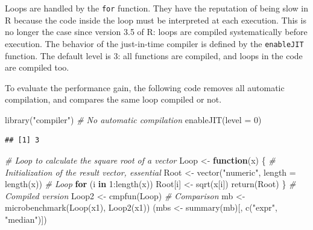 \documentclass[
  12pt,
  american,
  a4paper,
  extrafontsizes,onecolumn,openright
  ]{memoir}
\newenvironment{Shaded}{\begin{snugshade}}{\end{snugshade}}
\newcommand{\AttributeTok}[1]{\textcolor[rgb]{0.77,0.63,0.00}{#1}}
\newcommand{\CommentTok}[1]{\textcolor[rgb]{0.56,0.35,0.01}{\textit{#1}}}
\newcommand{\ControlFlowTok}[1]{\textcolor[rgb]{0.13,0.29,0.53}{\textbf{#1}}}
\newcommand{\DecValTok}[1]{\textcolor[rgb]{0.00,0.00,0.81}{#1}}
\newcommand{\FunctionTok}[1]{\textcolor[rgb]{0.00,0.00,0.00}{#1}}
\newcommand{\NormalTok}[1]{#1}
\newcommand{\OtherTok}[1]{\textcolor[rgb]{0.56,0.35,0.01}{#1}}
\newcommand{\SpecialCharTok}[1]{\textcolor[rgb]{0.00,0.00,0.00}{#1}}
\newcommand{\StringTok}[1]{\textcolor[rgb]{0.31,0.60,0.02}{#1}}
\newlength{\rf}
\begin{document}
Loops are handled by the \texttt{for} function.
They have the reputation of being slow in R because the code inside the loop must be interpreted at each execution.
This is no longer the case since version 3.5 of R: loops are compiled systematically before execution.
The behavior of the just-in-time compiler is defined by the \texttt{enableJIT} function.
The default level is 3: all functions are compiled, and loops in the code are compiled too.

To evaluate the performance gain, the following code removes all automatic compilation, and compares the same loop compiled or not.

\scriptsize

\begin{Shaded}
\begin{Highlighting}[]
\FunctionTok{library}\NormalTok{(}\StringTok{"compiler"}\NormalTok{)}
\CommentTok{\# No automatic compilation}
\FunctionTok{enableJIT}\NormalTok{(}\AttributeTok{level =} \DecValTok{0}\NormalTok{)}
\end{Highlighting}
\end{Shaded}

\begin{verbatim}
## [1] 3
\end{verbatim}

\begin{Shaded}
\begin{Highlighting}[]
\CommentTok{\# Loop to calculate the square root of a vector}
\NormalTok{Loop }\OtherTok{\textless{}{-}} \ControlFlowTok{function}\NormalTok{(x) \{}
    \CommentTok{\# Initialization of the result vector, essential}
\NormalTok{    Root }\OtherTok{\textless{}{-}} \FunctionTok{vector}\NormalTok{(}\StringTok{"numeric"}\NormalTok{, }\AttributeTok{length =} \FunctionTok{length}\NormalTok{(x))}
    \CommentTok{\# Loop}
    \ControlFlowTok{for}\NormalTok{ (i }\ControlFlowTok{in} \DecValTok{1}\SpecialCharTok{:}\FunctionTok{length}\NormalTok{(x)) Root[i] }\OtherTok{\textless{}{-}} \FunctionTok{sqrt}\NormalTok{(x[i])}
    \FunctionTok{return}\NormalTok{(Root)}
\NormalTok{\}}
\CommentTok{\# Compiled version}
\NormalTok{Loop2 }\OtherTok{\textless{}{-}} \FunctionTok{cmpfun}\NormalTok{(Loop)}
\CommentTok{\# Comparison}
\NormalTok{mb }\OtherTok{\textless{}{-}} \FunctionTok{microbenchmark}\NormalTok{(}\FunctionTok{Loop}\NormalTok{(x1), }\FunctionTok{Loop2}\NormalTok{(x1))}
\NormalTok{(mbs }\OtherTok{\textless{}{-}} \FunctionTok{summary}\NormalTok{(mb)[, }\FunctionTok{c}\NormalTok{(}\StringTok{"expr"}\NormalTok{, }\StringTok{"median"}\NormalTok{)])}
\end{Highlighting}
\end{Shaded}
\end{document}
